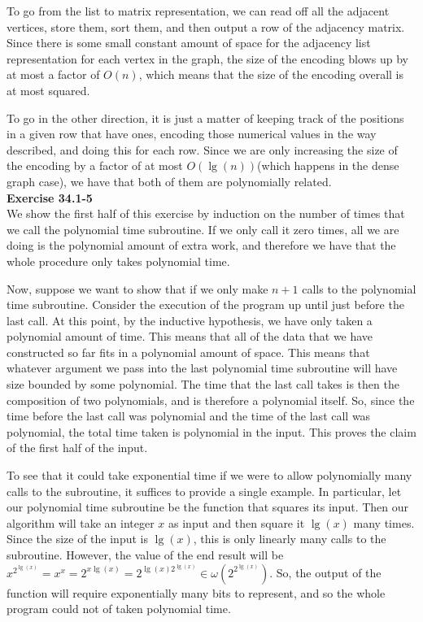 \documentclass{article}
\begin{document}
To go from the list to matrix representation, we can read off all the adjacent vertices, store them, sort them, and then output a row of the adjacency matrix. Since there is some small constant amount of space for the adjacency list representation for each vertex in the graph, the size of the encoding blows up by at most a factor of $O(n)$, which means that the size of the encoding overall is at most squared.

To go in the other direction, it is just a matter of keeping track of the positions in a given row that have ones, encoding those numerical values in the way described, and doing this for each row. Since we are only increasing the size of the encoding by a factor of at most $O(\lg(n))$(which happens in the dense graph case), we have that both of them are polynomially related.\\



\noindent\textbf{Exercise 34.1-5}\\

We show the first half of this exercise by induction on the number of times that we call the polynomial time subroutine. If we only call it zero times, all we are doing is the polynomial amount of extra work, and therefore we have that the whole procedure only takes polynomial time.

Now, suppose we want to show that if we only make $n+1$ calls to the polynomial time subroutine. Consider the execution of the program up until just before the last call. At this point, by the inductive hypothesis, we have only taken a polynomial amount of time. This means that all of the data that we have constructed so far fits in a polynomial amount of space. This means that whatever argument we pass into the last polynomial time subroutine will have size bounded by some polynomial. The time that the last call takes is then the composition of two polynomials, and is therefore a polynomial itself. So, since the time before the last call was polynomial and the time of the last call was polynomial, the total time taken is polynomial in the input. This proves the claim of the first half of the input.

To see that it could take exponential time if we were to allow polynomially many calls to the subroutine, it suffices to provide a single example. In particular, let our polynomial time subroutine be the function that squares its input. Then our algorithm will take an integer $x$ as input and then square it $\lg(x)$ many times. Since the size of the input is $\lg(x)$, this is only linearly many calls to the subroutine. However, the value of the end result will be $x^{2^{\lg(x)}} = x^x = 2^{x\lg(x)} =2^{\lg(x)2^{\lg(x)}} \in \omega(2^{2^{\lg(x)}})$. So, the output of the function will require exponentially many bits to represent, and so the whole program could not of taken polynomial time.\\
\end{document}
